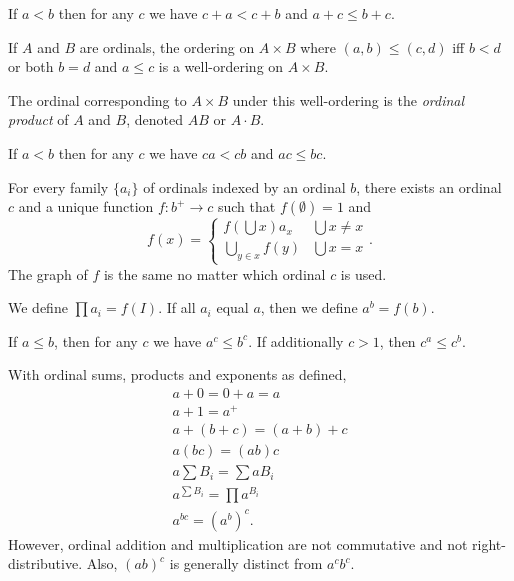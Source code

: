 \begin{cor}
    If $a<b$ then for any $c$ we have $c+a<c+b$ and $a+c\le b+c$.
\end{cor}
\begin{prop}
  If $A$ and $B$ are ordinals, the ordering on $A\times B$ where
  $(a,b)\le (c,d)$ iff $b<d$ or both $b=d$ and $a\le c$
  is a well-ordering on $A\times B$.
\end{prop}
\begin{defn}
  The ordinal corresponding to $A\times B$ under this well-ordering is the
  \emph{ordinal product} of $A$ and $B$, denoted $AB$ or $A\cdot B$.
\end{defn}
\begin{prop}
    If $a<b$ then for any $c$ we have $ca<cb$ and $ac\le bc$.
\end{prop}
\begin{prop}
    For every family $\{a_i\}$ of ordinals indexed by an ordinal $b$,
    there exists an ordinal $c$ and a unique function $f:b^+\to c$ such that
    $f(\emptyset)=1$ and 
    \[f(x)=\begin{cases} f(\bigcup x) a_x&\bigcup x\ne x \\ \bigcup_{y\in
    x}f(y)&\bigcup x=x\end{cases}.\]
    The graph of $f$ is the same no matter which ordinal $c$ is used.
\end{prop}
\begin{defn}
  We define $\prod a_i=f(I)$. If all $a_i$ equal $a$, then we define $a^b=f(b)$.
\end{defn}
\begin{prop}
    If $a\le b$, then for any $c$ we have $a^c\le b^c$. If additionally
    $c>1$, then $c^a\le c^b$.
\end{prop}
\begin{prop}
  With ordinal sums, products and exponents as defined,
  \begin{align*}
    a+0=0+a=a \\
    a+1=a^+ \\
    a+(b+c)=(a+b)+c \\
    a(bc)=(ab)c \\
    a\sum B_i=\sum a{B_i} \\
    a^{\sum B_i}=\prod a^{B_i} \\
    a^{bc}=(a^b)^c.
  \end{align*}
  However, ordinal addition and multiplication are not commutative and not
  right-distributive. Also, $(ab)^c$ is generally distinct from $a^c b^c$.
\end{prop}
